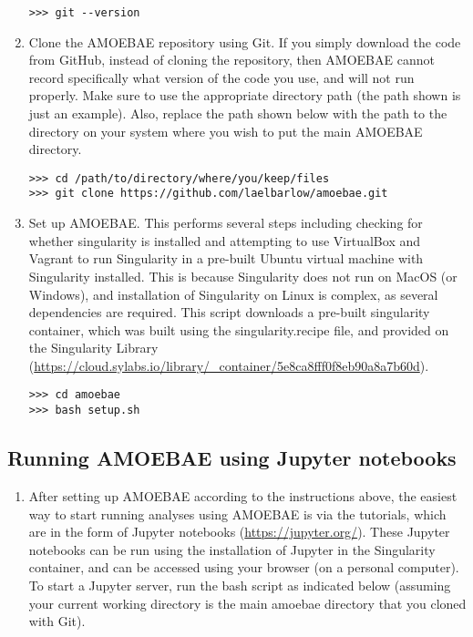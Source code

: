\documentclass[12pt,letterpaper]{article}
\begin{document}
\begin{linenumbers}
\begin{enumerate}
\begin{lstlisting}
>>> git --version
\end{lstlisting}

\item Clone the AMOEBAE repository using Git. If you simply download the code
    from GitHub, instead of cloning the repository, then AMOEBAE cannot record
        specifically what version of the code you use, and will not run
        properly. Make sure to use the appropriate directory path (the path
        shown is just an example). Also, replace the path shown below with
        the path to the directory on your system where you wish to put the main
        AMOEBAE directory.

\begin{lstlisting}
>>> cd /path/to/directory/where/you/keep/files
>>> git clone https://github.com/laelbarlow/amoebae.git
\end{lstlisting}

\item Set up AMOEBAE. This performs several steps including checking for
    whether singularity is installed and attempting to use VirtualBox and
        Vagrant to run Singularity in a pre-built Ubuntu virtual machine with
        Singularity installed. This is because Singularity does not run on
        MacOS (or Windows), and installation of Singularity on Linux is
        complex, as several dependencies are required. This script downloads
        a pre-built singularity container, which was built using the
        singularity.recipe file, and provided on the Singularity Library
        (\url{https://cloud.sylabs.io/library/_container/5e8ca8fff0f8eb90a8a7b60d}).

\begin{lstlisting}
>>> cd amoebae
>>> bash setup.sh
\end{lstlisting}




\end{enumerate}

\subsection{Running AMOEBAE using Jupyter notebooks}
\label{jupyter_section}


\begin{enumerate}

\item After setting up AMOEBAE according to the instructions above, the easiest
    way to start running analyses using AMOEBAE is via the tutorials, which are in the
        form of Jupyter notebooks (\url{https://jupyter.org/}).  These Jupyter
        notebooks can be run using the installation of Jupyter in the
        Singularity container, and can be accessed using your browser (on a
        personal computer). To start a Jupyter server, run the bash script as
        indicated below (assuming your current working directory is the main
        amoebae directory that you cloned with Git).


\end{enumerate}
\end{linenumbers}
\end{document}
